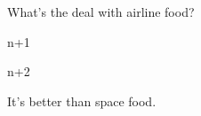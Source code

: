 \documentclass{article}
\begin{document}

    \thispagestyle{fancy}

    \begin{question}

        What's the deal with airline food? 

    \end{question}

    \begin{subquestions}
        \item n+1
    \end{subquestions}

    \begin{seedquestions}
        \item n+2
    \end{seedquestions}

    \begin{answer}

        It's better than space food.

    \end{answer}

    \printbibliography
\end{document}
